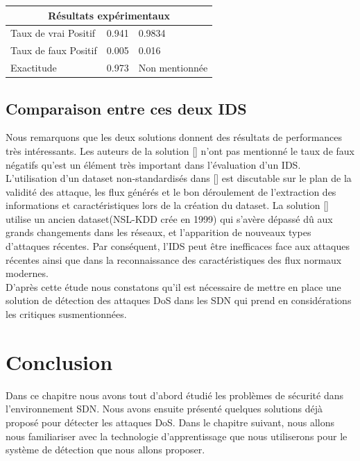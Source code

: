 \begin{tabular}{| m{4cm} | m{5cm} | m{5cm} |}
\multicolumn{3}{c}{Résultats expérimentaux}\\
\hline
Taux de vrai Positif & 0.941 & 0.9834\\
\hline
Taux de faux Positif & 0.005 & 0.016\\
\hline
Exactitude & 0.973 & Non mentionnée \\
\hline
\end{tabular}

\subsection{Comparaison entre ces deux IDS}
Nous remarquons que les deux solutions donnent des résultats de performances très intéressants. Les auteurs de la solution [\cite{8}] n’ont pas mentionné le taux de faux négatifs qu’est un élément très important dans l’évaluation d’un IDS. L’utilisation d’un dataset non-standardisés dans [\cite{8}] est discutable sur le plan de la validité des attaque, les flux générés et le bon déroulement de l’extraction des informations et caractéristiques lors de la création du dataset. La solution [\cite{10}] utilise un ancien dataset(NSL-KDD crée en 1999) qui s’avère dépassé dû aux grands changements dans les réseaux, et l’apparition de nouveaux types d’attaques récentes. Par conséquent, l’IDS peut être inefficaces face aux attaques récentes ainsi que dans la reconnaissance des caractéristiques des flux normaux modernes.\\
D’après cette étude nous constatons qu’il est nécessaire de mettre en place une solution de détection des attaques DoS dans les SDN qui prend en considérations les critiques susmentionnées. 

\section{Conclusion}
Dans ce chapitre nous avons tout d’abord étudié les problèmes de sécurité dans l’environnement SDN. Nous avons ensuite présenté quelques solutions déjà proposé pour détecter les attaques DoS. Dans le chapitre suivant, nous allons nous familiariser avec la technologie d’apprentissage que nous utiliserons pour le système de détection que nous allons proposer. 